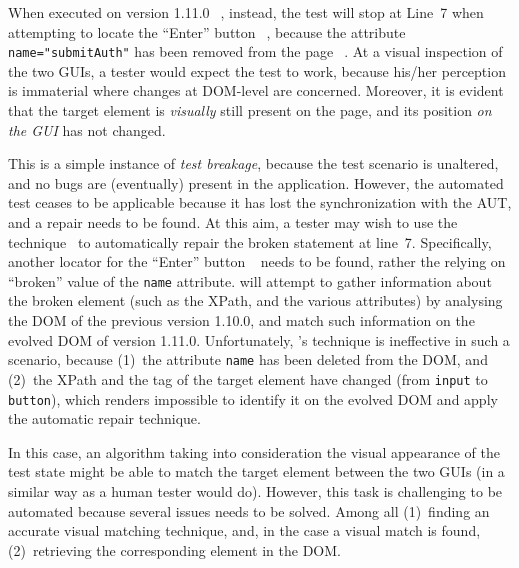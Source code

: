 When executed on version 1.11.0~\textcircled{}, instead, the test will stop at Line~7 when attempting to locate the ``Enter'' button~\textcircled{}, because the attribute \mbox{\texttt{name="submitAuth"}} has been removed from the page~\textcircled{}.
%
At a visual inspection of the two GUIs, a tester would expect the test to work, because his/her perception is immaterial where changes at DOM-level are concerned. Moreover, it is evident that the target element is \textit{visually} still present on the page, and its position \textit{on the GUI} has not changed.
 
This is a simple instance of \textit{test breakage}, because the test scenario is unaltered, and no bugs are (eventually) present in the application. However, the automated test ceases to be applicable because it has lost the synchronization with the AUT, and a repair needs to be found.
At this aim, a tester may wish to use the \water  technique~\cite{Choudhary:2011:WWA:2002931.2002935} to automatically repair the broken statement at line~7. Specifically, another locator for the ``Enter'' button~\textcircled{} needs to be found, rather the relying on ``broken'' value of the \texttt{name} attribute. \water will attempt to gather information about the broken element (such as the XPath, and the various attributes) by analysing the DOM of the previous version 1.10.0, and match such information on the evolved DOM of version 1.11.0. Unfortunately, \water's technique is ineffective in such a scenario, because (1)~the attribute \texttt{name} has been deleted from the DOM, and (2)~the XPath and the tag of the target element have changed (from \mbox{\texttt{input}} to \mbox{\texttt{button}}), which renders impossible to identify it on the evolved DOM and apply the automatic repair technique.
 
In this case, an algorithm taking into consideration the visual appearance of the test state might be able to match the target element between the two GUIs (in a similar way as a human tester would do). However, this task is challenging to be automated because several issues needs to be solved. Among all (1)~finding an accurate visual matching technique, and, in the case a visual match is found, (2)~retrieving the corresponding element in the DOM. 

